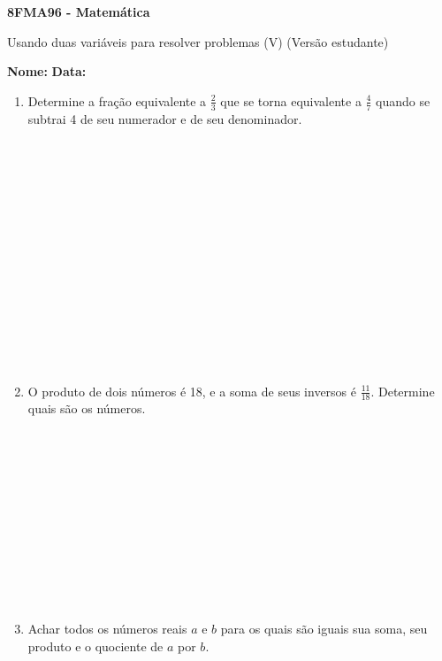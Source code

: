 \documentclass[a4paper,14pt]{article}
\begin{document}
	
	\noindent\textbf{8FMA96 - Matemática} 
	
	\begin{center}Usando duas variáveis para resolver problemas (V) (Versão estudante)
	\end{center}
	
	\noindent\textbf{Nome:} \underline{\hspace{10cm}}
	\noindent\textbf{Data:} \underline{\hspace{4cm}}
	
    \begin{multicols}{2}
    	\begin{enumerate}
			\item Determine a fração equivalente a $\frac{2}{3}$ que se torna equivalente a $\frac{4}{7}$ quando se subtrai 4 de seu numerador e de seu denominador. \\\\\\\\\\\\\\\\\\\\\\\\\\\\\\
			\item O produto de dois números é 18, e a soma de seus inversos é $\frac{11}{18}$. Determine quais são os números. \\\\\\\\\\\\\\\\\\\\\\\\
			\item Achar todos os números reais $a$ e $b$ para os quais são iguais sua soma, seu produto e o quociente de $a$ por $b$.  \\\\\\\\\\\\\\\\\\\\\\\\\\\\\\

\end{enumerate}
\end{multicols}
\end{document}
